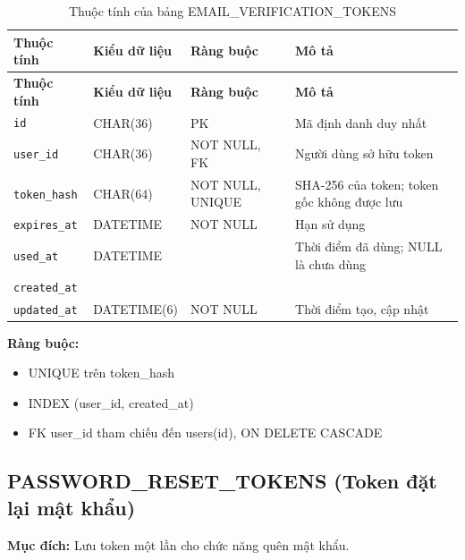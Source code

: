 {\small
\begin{longtable}{|P{3.2cm}|P{2.8cm}|P{2.2cm}|p{5.4cm}|}
    \caption{Thuộc tính của bảng EMAIL\_\allowbreak{}VERIFICATION\_\allowbreak{}TOKENS}
    \label{tab:email_verification_tokens} \\
    \hline
    \textbf{Thuộc tính} & \textbf{Kiểu dữ liệu} & \textbf{Ràng buộc} & \textbf{Mô tả} \\
    \hline
    \endfirsthead
    \hline
    \textbf{Thuộc tính} & \textbf{Kiểu dữ liệu} & \textbf{Ràng buộc} & \textbf{Mô tả} \\
    \hline
    \endhead

    \texttt{id} & CHAR(36) & PK & Mã định danh duy nhất \\
    \hline
    \texttt{user\_\allowbreak{}id} & CHAR(36) & NOT NULL, FK & Người dùng sở hữu token \\
    \hline
    \texttt{token\_\allowbreak{}hash} & CHAR(64) & NOT NULL, UNIQUE & SHA-256 của token; token gốc không được lưu \\
    \hline
    \texttt{expires\_\allowbreak{}at} & DATETIME & NOT NULL & Hạn sử dụng \\
    \hline
    \texttt{used\_\allowbreak{}at} & DATETIME &  & Thời điểm đã dùng; NULL là chưa dùng \\
    \hline
    \texttt{created\_\allowbreak{}at} &  &  &  \\
    \hline
    \texttt{updated\_\allowbreak{}at} & DATETIME(6) & NOT NULL & Thời điểm tạo, cập nhật \\
    \hline
\end{longtable}
}

\textbf{Ràng buộc:}
\begin{itemize}
    \item UNIQUE trên token\_\allowbreak{}hash
    \item INDEX (user\_\allowbreak{}id, created\_\allowbreak{}at)
    \item FK user\_\allowbreak{}id tham chiếu đến users(id), ON DELETE CASCADE
\end{itemize}

\subsection{PASSWORD\_\allowbreak{}RESET\_\allowbreak{}TOKENS (Token đặt lại mật khẩu)}

\textbf{Mục đích:} Lưu token một lần cho chức năng quên mật khẩu.

